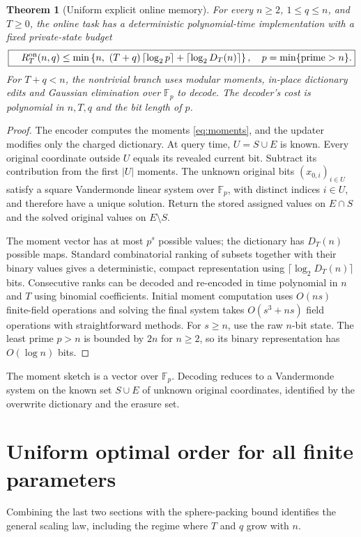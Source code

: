 \documentclass[11pt,a4paper]{article}
\newtheorem{theorem}{Theorem}[section]
\begin{document}
\begin{theorem}[Uniform explicit online memory]\label{thm:poly}
For every $n\ge2$, $1\le q\le n$, and $T\ge0$, the online task has a deterministic polynomial-time implementation with a fixed private-state budget
\begin{equation}\label{eq:poly}
\boxed{\quad R_T^{\rm on}(n,q)\le\min\left\{n,\ (T+q)\left\lceil\log_2p\right\rceil+\left\lceil\log_2D_T(n)\right\rceil\right\},\quad p=\min\{\text{prime}>n\}.}
\end{equation}
For $T+q<n$, the nontrivial branch uses modular moments, in-place dictionary edits and Gaussian elimination over $\mathbb F_p$ to decode. The decoder's cost is polynomial in $n,T,q$ and the bit length of $p$.
\end{theorem}
\begin{proof}
The encoder computes the moments \eqref{eq:moments}, and the updater modifies only the charged dictionary. At query time, $U=S\cup E$ is known. Every original coordinate outside $U$ equals its revealed current bit. Subtract its contribution from the first $|U|$ moments. The unknown original bits $(x_{0,i})_{i\in U}$ satisfy a square Vandermonde linear system over $\mathbb F_p$, with distinct indices $i\in U$, and therefore have a unique solution. Return the stored assigned values on $E\cap S$ and the solved original values on $E\setminus S$.

The moment vector has at most $p^s$ possible values; the dictionary has $D_T(n)$ possible maps. Standard combinatorial ranking of subsets together with their binary values gives a deterministic, compact representation using $\lceil\log_2D_T(n)\rceil$ bits. Consecutive ranks can be decoded and re-encoded in time polynomial in $n$ and $T$ using binomial coefficients. Initial moment computation uses $O(ns)$ finite-field operations and solving the final system takes $O(s^3+ns)$ field operations with straightforward methods. For $s\ge n$, use the raw $n$-bit state. The least prime $p>n$ is bounded by $2n$ for $n\ge2$, so its binary representation has $O(\log n)$ bits.
\end{proof}

The moment sketch is a vector over $\mathbb F_p$. Decoding reduces to a Vandermonde system on the known set $S\cup E$ of unknown original coordinates, identified by the overwrite dictionary and the erasure set.

\section{Uniform optimal order for all finite parameters}\label{sec:scale}
Combining the last two sections with the sphere-packing bound identifies the general scaling law, including the regime where $T$ and $q$ grow with $n$.
\end{document}
